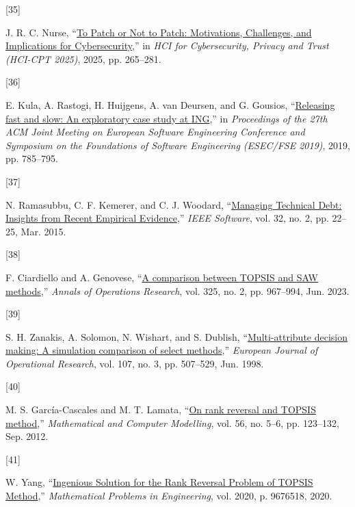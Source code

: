 \documentclass[
  journal,
]{IEEEtran}%
\newlength{\cslhangindent}
\newlength{\csllabelwidth}
\newenvironment{CSLReferences}[2] %
 {\begin{list}{}{%
  \setlength{\itemindent}{0pt}
  \setlength{\leftmargin}{0pt}
  \setlength{\parsep}{0pt}
  \ifodd #1
   \setlength{\leftmargin}{\cslhangindent}
   \setlength{\itemindent}{-1\cslhangindent}
  \fi
  \setlength{\itemsep}{#2\baselineskip}}}
 {\end{list}}
\newcommand{\CSLLeftMargin}[1]{\parbox[t]{\csllabelwidth}{\strut#1\strut}}
\newcommand{\CSLRightInline}[1]{\parbox[t]{\linewidth - \csllabelwidth}{\strut#1\strut}}
\begin{document}
\begin{CSLReferences}{0}{0}
\CSLLeftMargin{{[}35{]} }%
\CSLRightInline{J. R. C. Nurse,
{``\href{https://doi.org/10.1007/978-3-031-92833-8_16}{To {Patch} or
{Not} to {Patch}: {Motivations}, {Challenges}, and {Implications} for
{Cybersecurity}},''} in \emph{{HCI} for {Cybersecurity}, {Privacy} and
{Trust} ({HCI-CPT} 2025)}, 2025, pp. 265--281. }

\CSLLeftMargin{{[}36{]} }%
\CSLRightInline{E. Kula, A. Rastogi, H. Huijgens, A. van Deursen, and G.
Gousios, {``\href{https://doi.org/10.1145/3338906.3338978}{Releasing
fast and slow: {An} exploratory case study at {ING}},''} in
\emph{Proceedings of the 27th {ACM Joint Meeting} on {European Software
Engineering Conference} and {Symposium} on the {Foundations} of
{Software Engineering} ({ESEC}/{FSE} 2019)}, 2019, pp. 785--795. }

\CSLLeftMargin{{[}37{]} }%
\CSLRightInline{N. Ramasubbu, C. F. Kemerer, and C. J. Woodard,
{``\href{https://doi.org/10.1109/MS.2015.45}{Managing {Technical Debt}:
{Insights} from {Recent Empirical Evidence}},''} \emph{IEEE Software},
vol. 32, no. 2, pp. 22--25, Mar. 2015. }

\CSLLeftMargin{{[}38{]} }%
\CSLRightInline{F. Ciardiello and A. Genovese,
{``\href{https://doi.org/10.1007/s10479-023-05339-w}{A comparison
between {TOPSIS} and {SAW} methods},''} \emph{Annals of Operations
Research}, vol. 325, no. 2, pp. 967--994, Jun. 2023. }

\CSLLeftMargin{{[}39{]} }%
\CSLRightInline{S. H. Zanakis, A. Solomon, N. Wishart, and S. Dublish,
{``\href{https://doi.org/10.1016/S0377-2217(97)00147-1}{Multi-attribute
decision making: {A} simulation comparison of select methods},''}
\emph{European Journal of Operational Research}, vol. 107, no. 3, pp.
507--529, Jun. 1998. }

\CSLLeftMargin{{[}40{]} }%
\CSLRightInline{M. S. García-Cascales and M. T. Lamata,
{``\href{https://doi.org/10.1016/j.mcm.2011.12.022}{On rank reversal and
{TOPSIS} method},''} \emph{Mathematical and Computer Modelling}, vol.
56, no. 5--6, pp. 123--132, Sep. 2012. }

\CSLLeftMargin{{[}41{]} }%
\CSLRightInline{W. Yang,
{``\href{https://doi.org/10.1155/2020/9676518}{Ingenious {Solution} for
the {Rank Reversal Problem} of {TOPSIS Method}},''} \emph{Mathematical
Problems in Engineering}, vol. 2020, p. 9676518, 2020. }


\end{CSLReferences}
\end{document}
